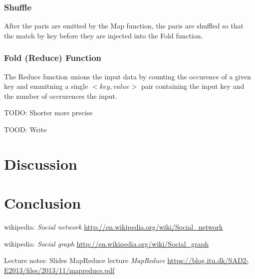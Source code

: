 \documentclass{article}
\begin{document}
\subsubsection{Shuffle}
After the paris are emitted by the Map function, the paris are shuffled so that the match by key before they are injected into the Fold function.


\subsubsection{Fold (Reduce) Function}
The Reduce function unions the input data by counting the occurence of a given key and emmitning a single $<key,value>$ pair containing the input key and the number of occrurences the input.




TODO: Shorter more precise


TOOD: Write


\section{Discussion}

\section{Conclusion}

\begin{thebibliography}{1}

    wikipedia:
    \emph{Social network}
    \url{http://en.wikipedia.org/wiki/Social_network}

    wikipedia:
    \emph{Social graph}
    \url{http://en.wikipedia.org/wiki/Social_graph}

    Lecture notes: Slides MapReduce lecture
    \emph{MapReduce}
    \url{https://blog.itu.dk/SAD2-E2013/files/2013/11/mapreduce.pdf}
    
\end{thebibliography}
\end{document}
